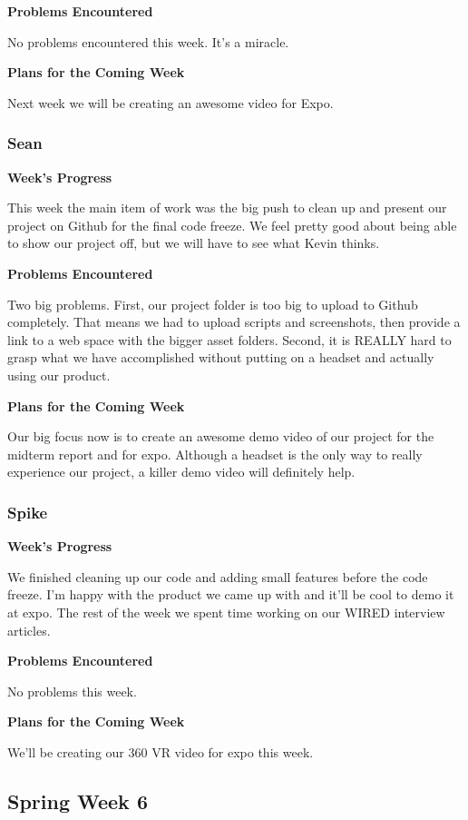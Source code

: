 \documentclass[10pt,journal,compsoc,onecolumn, draftclsnofoot]{IEEEtran}
\begin{document}
\noindent \textbf{Problems Encountered}

No problems encountered this week. It's a miracle.

\noindent \textbf{Plans for the Coming Week}

Next week we will be creating an awesome video for Expo.

\subsubsection{Sean}
\noindent \textbf{Week's Progress}

This week the main item of work was the big push to clean up and present our project on Github for the final code freeze. We feel pretty good about being able to show our project off, but we will have to see what Kevin thinks.

\noindent \textbf{Problems Encountered}

Two big problems. First, our project folder is too big to upload to Github completely. That means we had to upload scripts and screenshots, then provide a link to a web space with the bigger asset folders. Second, it is REALLY hard to grasp what we have accomplished without putting on a headset and actually using our product.

\noindent \textbf{Plans for the Coming Week}

Our big focus now is to create an awesome demo video of our project for the midterm report and for expo. Although a headset is the only way to really experience our project, a killer demo video will definitely help.

\subsubsection{Spike}
\noindent \textbf{Week's Progress}

We finished cleaning up our code and adding small features before the code freeze. I'm happy with the product we came up with and it'll be cool to demo it at expo. The rest of the week we spent time working on our WIRED interview articles.

\noindent \textbf{Problems Encountered}

No problems this week.

\noindent \textbf{Plans for the Coming Week}

We'll be creating our 360 VR video for expo this week.

\subsection{Spring Week 6}
\end{document}
